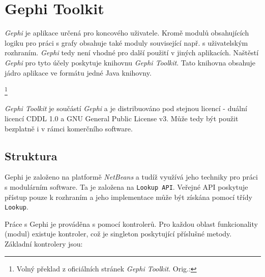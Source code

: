 \documentclass[thesis=M,czech]{FITthesis}[2014/05/6]
\begin{document}
\section{Gephi Toolkit}
\textit{Gephi} je aplikace určená pro koncového uživatele. Kromě modulů obsahujících logiku pro práci s grafy obsahuje také moduly související např. s uživatelským
rozhraním. \textit{Gephi} tedy není vhodné pro další použití v jiných aplikacích. Naštěstí \textit{Gephi} pro tyto účely poskytuje knihovnu \textit{Gephi Toolkit}.
Tato knihovna obsahuje jádro aplikace ve formátu jedné Java knihovny.

\footnote{Volný překlad z oficiálních stránek \textit{Gephi Toolkit}\cite{gephi:toolkit}. Orig.:
}

\textit{Gephi Toolkit} je součástí \textit{Gephi} a je distribuováno pod stejnou licencí - duální licencí CDDL 1.0 a GNU General Public License v3.
Může tedy být použit bezplatně i v rámci komerčního software.

\subsection{Struktura}
Gephi je založeno na platformě \textit{NetBeans} a tudíž využívá jeho techniky pro práci s modulárním software. Ta je založena na 
\texttt{Lookup API}. Veřejné API poskytuje přístup pouze k rozhraním a jeho implementace může být získána pomocí třídy \texttt{Lookup}.



Práce s Gephi je prováděna s pomocí kontrolerů. Pro každou oblast funkcionality (modul) existuje kontroler, což je 
singleton poskytující příslušné metody. Základní kontrolery jsou:
\end{document}
